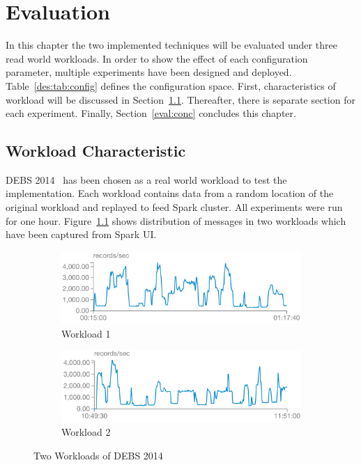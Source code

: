 \chapter{Evaluation}
\label{eval}
In this chapter the two implemented techniques will be evaluated under three read world workloads. In order to show the effect of each configuration parameter, multiple experiments have been designed and deployed. Table~\ref{des:tab:config} defines the configuration space. First, characteristics of workload will be discussed in Section~\ref{eval:workload}. Thereafter, there is separate section for each experiment. Finally, Section~\ref{eval:conc} concludes this chapter.

\section{Workload Characteristic}
\label{eval:workload}

DEBS 2014~\cite{debs2014} has been chosen as a real world workload to test the implementation. Each workload contains data from a random location of the original workload and replayed to feed Spark cluster. All experiments were run for one hour. Figure~\ref{eval:fig:workload} shows distribution of messages in two workloads which have been captured from Spark UI.
\begin{figure}[!htbp]
    \centering
      \begin{subfigure}[h]{\linewidth}
        \centering\includegraphics[scale=0.6]{workload1.png}
        \caption{Workload 1}
    \end{subfigure}
    \begin{subfigure}[h]{\linewidth}
        \centering\includegraphics[scale=0.6]{workload2.png}
        \caption{Workload 2}
    \end{subfigure}
    \caption{Two Workloads of DEBS 2014}
    \label{eval:fig:workload}
\end{figure}

